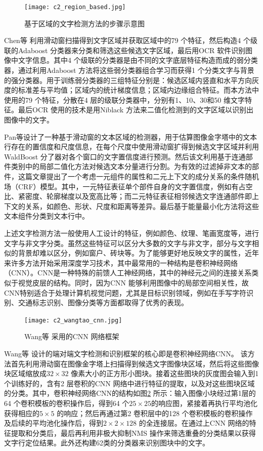     \begin{figure}[!h]
    \centering
    \texttt{[image: c2\_region\_based.jpg]}
    \caption{基于区域的文字检测方法的步骤示意图}
    \label{fig.c2_region_based}
    \end{figure}

    Chen等\cite{Chen2004Detecting} 利用滑动窗扫描得到文字区域并获取区域中的79 个特征，然后构造4 个级联的Adaboost 分类器来分类和筛选这些候选文字区域，最后用OCR 软件识别图像中文字信息。其中4 个级联的分类器是由不同的文字底层特征构造而成的弱分类器，通过利用Adaboost 方法将这些弱分类器组合学习而获得1 个分类文字与背景的强分类器。用于训练弱分类器的三组特征分别是：候选区域内竖直和水平方向灰度的标准差与平均值；区域内的统计梯度信息；区域内边缘组合特征。而本方法中使用的79 个特征，分散在4 层的级联分类器中，分别有1、10、30和50 维文字特征。最后OCR 使用的技术是用Niblack 方法来二值化检测到的文字区域以识别出图像中的文字。

    Pan等\cite{Pan2011A}设计了一种基于滑动窗的文本区域的检测器，用于估算图像金字塔中的文本行存在的置信度和尺度信息，在每个尺度中使用滑动窗扩得到候选文字区域并利用WaldBoost 分了器对各个窗口的文字置信度进行预测。然后该文利用基于连通部件类别中的局部二值化方法对候选文本分量进行分割。为有效的过滤掉非文本的部件，这篇文章提出了一个考虑一元组件的属性和二元上下文的成分关系的条件随机场（CRF）模型。其中，一元特征表征单个部件自身的文字置信度，例如有占空比、紧密度、轮廓梯度以及宽高比等；而二元特征表征相邻候选文字连通部件即上下文的关系，如颜色、形状、尺度和距离等差异。最后基于能量最小化方法将这些文本组件分类到文本行中。

    上述文字检测方法一般使用人工设计的特征，例如颜色、纹理、笔画宽度等，进行文字与非文字分类。虽然这些特征可以区分大多数的文字与非文字，部分与文字相似的背景却难以区分，例如窗户、砖块等。为了能够更好地反映文字的属性，近年来许多方法开始采用深度学习技术，其中最常用的一种结构是卷积神经网络（CNN）。CNN是一种特殊的前馈人工神经网络，其中的神经元之间的连接关系类似于视觉皮层的结构。同时，因为CNN 能够利用图像中的局部空间相关性，故CNN特别适合于处理计算机视觉问题，尤其是目标识别领域，例如在手写字符识别、交通标志识别、图像分类等方面都取得了优秀的表现。

    \begin{figure}[!h]
    \centering
    \texttt{[image: c2\_wangtao\_cnn.jpg]}
    \caption{Wang等\cite{Wang2012End} 采用的CNN 网络框架}
    \label{fig.c2_wangtao_cnn}
    \end{figure}

    Wang等\cite{Wang2012End} 设计的端对端文字检测和识别框架的核心即是卷积神经网络CNN。 该方法首先利用滑动窗在图像金字塔上扫描得到候选文字图像块区域，然后将这些图像块区域缩放成$32\times32$ 像素大小的正方形小图块。接着这些图块的灰度图会输入到1 个训练好的，含有2 层卷积的CNN 网络中进行特征的提取，以及对这些图块区域的分类。其中，卷积神经网络CNN的结构如图\ref{fig.c2_wangtao_cnn} 所示：输入图像小块经过第1层的64 个卷积模板的卷积操作后，得到64 个$25\times25$的响应图，紧接着再执行平均池化获得相应的$5\times5$ 的响应；然后再通过第2 卷积层中的128 个卷积模板的卷积操作及后续的平均池化操作后，得到$2\times2\times128$ 的全连接层。在通过上CNN 网络的特征提取和分类后，最后再利用非极大抑制NMS 操作来筛选重叠的分类结果以获得文字行定位结果。此外还构建62类的分类器来识别图块中的文字。

